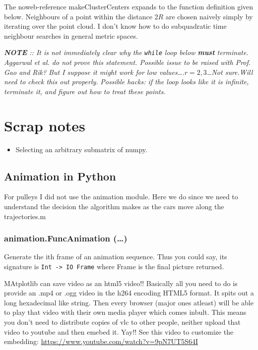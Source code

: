 \documentclass[11pt]{article}
\begin{document}
The noweb-reference makeClusterCenters expands to the function definition given below. Neighbours of a point within
the distance $2R$ are chosen naively simply by iterating over the point cloud. I don't know how to do subquadratic 
time neighbour searches in general metric spaces. 

\emph{\textbf{NOTE} :: It is not immediately clear why the \verb~while~ loop below \textbf{must} terminate. Aggarwal et al.  do not prove this statement.  Possible 
 issue to be raised with Prof. Gao and Rik? But I suppose it might work for low values\ldots{}.$r = 2,3$\ldots{}Not sure.Will need to check this out properly.}
\emph{Possible hacks: if the loop looks like it is infinite, terminate it, and figure out how to treat these points.}


\section{Scrap notes}
\label{sec-4}
\begin{itemize}
\item Selecting an arbitrary submatrix of numpy.
\end{itemize}

\subsection{Animation in Python}
\label{sec-4-1}
For pulleys I did not use the animation module. Here we do since we need to understand the decision the algorithm
makes as the cars move along the trajectories.m 


\subsubsection{animation.FuncAnimation (\ldots{})}
\label{sec-4-1-1}
Generate the ith frame of an animation sequence. Thus you could say, its signature is \verb~Int -> IO Frame~ where 
Frame is the final picture returned.  

MAtplotlib can save video as an html5 video!! Basically all you need to do is provide an .mp4 or .ogg video
in the h264 encoding HTML5 format. It spits out a long hexadecimal like string.  
Then every browser (major ones atleast) will be able to play that video 
with their own media player which comes inbult. This means you don't need to distribute copies of vlc to other
people, neither upload that video to youtube and then emebed it. Yay!! 
See this video to customize the embedding: \url{https://www.youtube.com/watch?v=9pN7UT5S64I}
\end{document}

